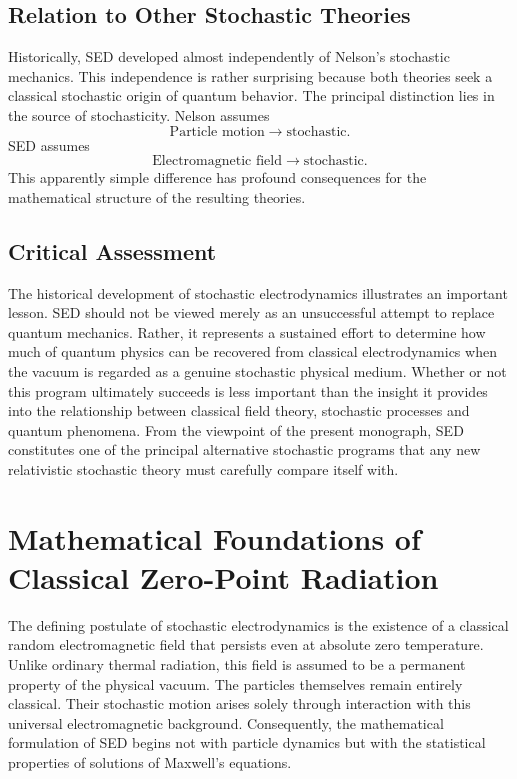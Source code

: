 \subsection{Relation to Other Stochastic Theories}
Historically, SED developed almost independently of Nelson's stochastic
mechanics.
This independence is rather surprising because both theories seek a
classical stochastic origin of quantum behavior.
The principal distinction lies in the source of stochasticity.
Nelson assumes
\[\boxed{\text{Particle motion}\longrightarrow\text{stochastic}.}\]
SED assumes
\[\boxed{\text{Electromagnetic field}\longrightarrow\text{stochastic}.}\]
This apparently simple difference has profound consequences for the
mathematical structure of the resulting theories.
\subsection*{Critical Assessment}
The historical development of stochastic electrodynamics illustrates an
important lesson.
SED should not be viewed merely as an unsuccessful attempt to replace
quantum mechanics.
Rather, it represents a sustained effort to determine how much of
quantum physics can be recovered from classical electrodynamics when the
vacuum is regarded as a genuine stochastic physical medium.
Whether or not this program ultimately succeeds is less important than
the insight it provides into the relationship between classical field
theory, stochastic processes and quantum phenomena.
From the viewpoint of the present monograph, SED constitutes one of the
principal alternative stochastic programs that any new relativistic
stochastic theory must carefully compare itself with.
\section{Mathematical Foundations of Classical Zero-Point Radiation}
\label{sec:SEDMathematical}
The defining postulate of stochastic electrodynamics is the existence of
a classical random electromagnetic field that persists even at absolute
zero temperature. Unlike ordinary thermal radiation, this field is
assumed to be a permanent property of the physical vacuum.
The particles themselves remain entirely classical. Their stochastic
motion arises solely through interaction with this universal
electromagnetic background.
Consequently, the mathematical formulation of SED begins not with
particle dynamics but with the statistical properties of solutions of
Maxwell's equations.
